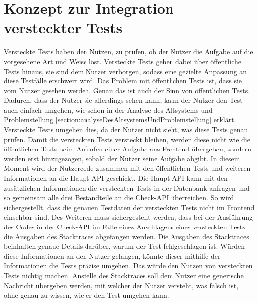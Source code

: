 \section{Konzept zur Integration versteckter Tests}
Versteckte Tests haben den Nutzen, zu prüfen, ob der Nutzer die Aufgabe auf die vorgesehene Art und Weise löst. Versteckte Tests gehen dabei über öffentliche Tests hinaus, sie sind dem Nutzer verborgen, sodass eine gezielte Anpassung an diese Testfälle erschwert wird. Das Problem mit öffentlichen Tests ist, dass sie vom Nutzer gesehen werden. Genau das ist auch der Sinn von öffentlichen Tests. Dadurch, dass der Nutzer sie allerdings sehen kann, kann der Nutzer den Test auch einfach umgehen, wie schon in der Analyse des Altsystems und Problemstellung \ref{section:analyseDesAltsystemsUndProblemstellung} erklärt. Versteckte Tests umgehen dies, da der Nutzer nicht sieht, was diese Tests genau prüfen.
Damit die versteckten Tests versteckt bleiben, werden diese nicht wie die öffentlichen Tests beim Aufrufen einer Aufgabe ans Frontend übergeben, sondern werden erst hinzugezogen, sobald der Nutzer seine Aufgabe abgibt. In diesem Moment wird der Nutzercode zusammen mit den öffentlichen Tests und weiteren Informationen an die Haupt-API geschickt. Die Haupt-API kann mit den zusätzlichen Informationen die versteckten Tests in der Datenbank anfragen und so gemeinsam alle drei Bestandteile an die Check-API überreichen. So wird sichergestellt, dass die genauen Testdaten der versteckten Tests nicht im Frontend einsehbar sind. Des Weiteren muss sichergestellt werden, dass bei der Ausführung des Codes in der Check-API im Falle eines Anschlagens eines versteckten Tests die Ausgaben des Stacktraces abgefangen werden. Die Ausgaben des Stacktraces beinhalten genaue Details darüber, warum der Test fehlgeschlagen ist. Würden diese Informationen an den Nutzer gelangen, könnte dieser mithilfe der Informationen die Tests präzise umgehen. Das würde den Nutzen von versteckten Tests nichtig machen. Anstelle des Stacktraces soll dem Nutzer eine generische Nachricht übergeben werden, mit welcher der Nutzer versteht, was falsch ist, ohne genau zu wissen, wie er den Test umgehen kann.


